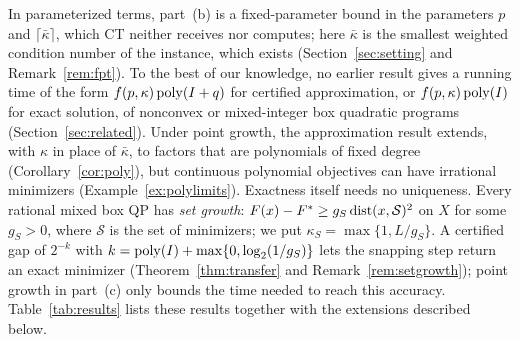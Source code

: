 In parameterized terms, part~(b) is a fixed-parameter bound in the
parameters $p$ and $\lceil\bar\kappa\rceil$, which CT neither receives nor
computes; here $\bar\kappa$ is the smallest weighted condition number of the
instance, which exists (Section~\ref{sec:setting} and
Remark~\ref{rem:fpt}). To the best of our knowledge, no earlier result gives
a running time of the form $f(p,\kappa)\operatorname{poly}(I+q)$ for certified approximation, or
$f(p,\kappa)\operatorname{poly}(I)$ for exact solution, of nonconvex or mixed-integer box
quadratic programs (Section~\ref{sec:related}). Under point growth, the
approximation result extends, with $\kappa$ in place of $\bar\kappa$, to
factors that are polynomials of fixed degree (Corollary~\ref{cor:poly}), but
continuous polynomial objectives can have irrational minimizers
(Example~\ref{ex:polylimits}).
Exactness itself needs no uniqueness. Every rational mixed box QP has
\emph{set growth}: $F(x)-F^{*}\ge g_S\operatorname{dist}(x,\mathcal S)^2$ on $X$ for some
$g_S>0$, where $\mathcal S$ is the set of minimizers; we put
$\kappa_S=\max\{1,L/g_S\}$. A certified gap of $2^{-k}$ with
$k=\operatorname{poly}(I)+\max\{0,\log_2(1/g_S)\}$ lets the snapping step return an exact
minimizer (Theorem~\ref{thm:transfer} and Remark~\ref{rem:setgrowth});
point growth in part~(c) only bounds the time needed to reach this
accuracy. Table~\ref{tab:results} lists these results together with the
extensions described below.

